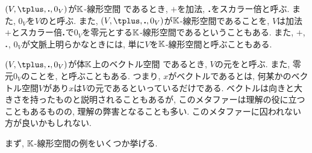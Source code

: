 \begin{remark}
  $(V,\plus,\act ,0_V)$が$\mathbb{K}$-線形空間
  であるとき,
  $\plus$を加法,
  $\mathbin{\boldsymbol{.}} $をスカラー倍と呼ぶ.
  また, $0_V$を$V$のと呼ぶ.
  また, 
  $(V,\plus,\act ,0_V)$が$\mathbb{K}$-線形空間であることを,
  $V$は加法$\plus$とスカラー倍$\mathbin{\boldsymbol{.}} $で$0_V$を零元とする$\mathbb{K}$-線形空間であるということもある.
  また, $\plus$, $\mathbin{\boldsymbol{.}} $, $0_V$が文脈上明らかなときには,
  単に$V$を$\mathbb{K}$-線形空間と呼ぶこともある.
\end{remark}
\begin{remark}
  $(V,\plus,\act ,0_V)$が体$\mathbb{K}$上のベクトル空間
  であるとき,
  $V$の元をと呼ぶ.
  また, 零元$0_V$のことを, と呼ぶこともある.
つまり,
$x$がベクトルであるとは,
何某かのベクトル空間$V$があり$x$は$V$の元であるといっているだけである.
ベクトルは向きと大きさを持ったものと説明されることもあるが,
このメタファーは理解の役に立つこともあるものの,
理解の弊害となることも多い.
このメタファーに囚われない方が良いかもしれない.
\end{remark}

まず, $\mathbb{K}$-線形空間の例をいくつか挙げる.

